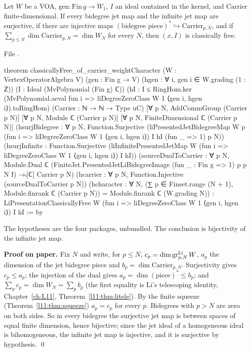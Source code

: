 \begin{theorem}\label{l24:thm:squeeze}
Let $W$ be a VOA, $\mathrm{gen}:\mathrm{Fin}\,g\to W_1$, $I$ an ideal contained in the kernel, and $\mathrm{Carrier}$
finite-dimensional. If every bidegree jet map and the infinite jet map are surjective, if there are
injective maps $(\text{bidegree piece})^*\hookrightarrow\mathrm{Carrier}_{p,N}$, and if
$\sum_{p\le N}\dim\mathrm{Carrier}_{p,N}=\dim W_N$ for every $N$, then $(x,I)$ is classically free.
\end{theorem}
\noindent File .
\begin{leancode}
theorem classicallyFree_of_carrier_weightCharacter
    (W : VertexOperatorAlgebra V)
    (gen : Fin g → V)
    (hgen : ∀ i, gen i ∈ W.grading (1 : ℤ))
    (I : Ideal (MvPolynomial (Fin g) ℂ))
    (hI : I ≤ RingHom.ker
      (MvPolynomial.aeval fun i =>
        liDegreeZeroClass W 1 ⟨gen i, hgen i⟩).toRingHom)
    (Carrier : ℕ → ℕ → Type uC)
    [∀ p N, AddCommGroup (Carrier p N)]
    [∀ p N, Module ℂ (Carrier p N)]
    [∀ p N, FiniteDimensional ℂ (Carrier p N)]
    (hsurjBidegree : ∀ p N, Function.Surjective
      (liPresentedJetBidegreeMap W p
        (fun i => liDegreeZeroClass W 1 ⟨gen i, hgen i⟩)
        I hI (fun _ => 1) p N))
    (hsurjInfinite : Function.Surjective
      (liInfinitePresentedJetMap W
        (fun i => liDegreeZeroClass W 1 ⟨gen i, hgen i⟩) I hI))
    (sourceDualToCarrier : ∀ p N,
      Module.Dual ℂ
        (FiniteJet.PresentedJetLiBidegreeImage (fun _ : Fin g => 1) p p N I) →ₗ[ℂ]
          Carrier p N)
    (hcarrier : ∀ p N, Function.Injective (sourceDualToCarrier p N))
    (hcharacter : ∀ N,
      (∑ p ∈ Finset.range (N + 1), Module.finrank ℂ (Carrier p N)) =
        Module.finrank ℂ (W.grading N)) :
    LiPresentationClassicallyFree W
      (fun i => liDegreeZeroClass W 1 ⟨gen i, hgen i⟩) I hI := by
\end{leancode}

\begin{dictionary}
The hypotheses are the four packages, unbundled. The conclusion is bijectivity of the infinite jet map.
\end{dictionary}

\textbf{Proof on paper.} Fix $N$ and write, for $p\le N$, $c_p=\dim\operatorname{gr}^{\mathrm{Li}}_{p,N}W$, $a_p$ the
dimension of the jet bidegree piece and $b_p=\dim\mathrm{Carrier}_{p,N}$. Surjectivity gives $c_p\le a_p$;
the injection of the dual gives $a_p=\dim(\text{piece})^*\le b_p$; and
$\sum_pc_p=\dim W_N=\sum_pb_p$ (the first equality is Li's telescoping identity, Chapter~\ref{ch:L11},
Theorem~\ref{l11:thm:litele}). By the finite squeeze (Theorem~\ref{l11:thm:squeeze}) $a_p=c_p$ for every
$p$. Bidegrees with $p>N$ are zero on both sides. So in every bidegree the surjective jet map is between
spaces of equal finite dimension, hence bijective; since the jet ideal of a homogeneous ideal is
bihomogeneous, the infinite jet map is injective, and it is surjective by hypothesis. \qed


